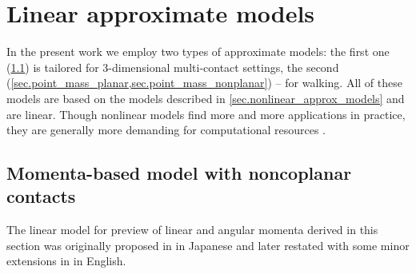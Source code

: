 \section{Linear approximate models}\label{sec.linear_approx_models}

In the present work we employ two types of approximate models: the first one
(\cref{sec.model_momenta}) is tailored for 3-dimensional multi-contact
settings, the second (\cref{sec.point_mass_planar,sec.point_mass_nonplanar}) --
for walking. All of these models are based on the models described in
\cref{sec.nonlinear_approx_models} and are linear. Though nonlinear models find
more and more applications in practice, they are generally more demanding for
computational resources \cite{Koenemann2015iros}.



\subsection{Momenta-based model with noncoplanar contacts}\label{sec.model_momenta}

The linear model for preview of linear and angular momenta derived in this
section was originally proposed in \cite{Nagasaka2012} in Japanese and later
restated with some minor extensions in \cite{Audren2014iros,
Sherikov2015humanoids} in English.


